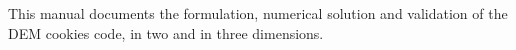 This manual documents the formulation, numerical solution and validation of the
DEM cookies code, in two and in three dimensions.
